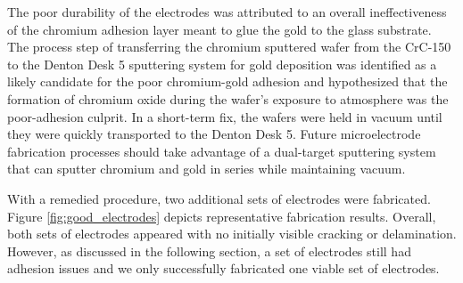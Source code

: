 \par The poor durability of the electrodes was attributed to an overall ineffectiveness of the chromium adhesion layer meant to glue the gold to the glass substrate. The process step of transferring the chromium sputtered wafer from the CrC-150 to the Denton Desk 5 sputtering system for gold deposition was identified as a likely candidate for the poor chromium-gold adhesion and hypothesized that the formation of chromium oxide during the wafer's exposure to atmosphere was the poor-adhesion culprit. In a short-term fix, the wafers were held in vacuum until they were quickly transported to the Denton Desk 5. Future microelectrode fabrication processes should take advantage of a dual-target sputtering system that can sputter chromium and gold in series while maintaining vacuum.  

\par With a remedied procedure, two additional sets of electrodes were fabricated. Figure \ref{fig:good_electrodes} depicts representative fabrication results. Overall, both sets of electrodes appeared with no initially visible cracking or delamination. However, as discussed in the following section, a set of electrodes still had adhesion issues and we only successfully fabricated one viable set of electrodes.

